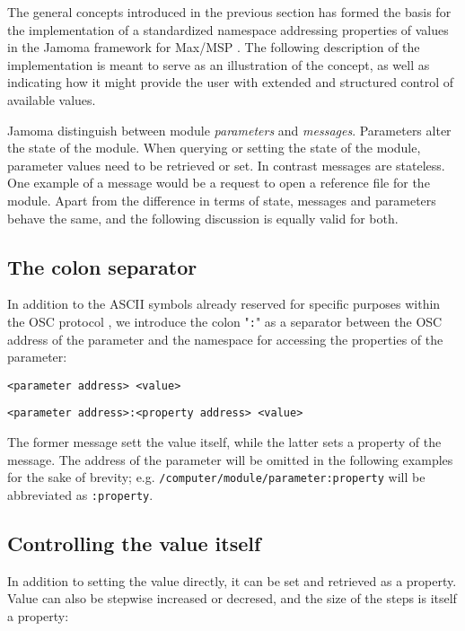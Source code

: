 \documentclass{sig-alternate}
\begin{document}
The general concepts introduced in the previous section has formed the basis for the implementation of a standardized namespace addressing properties of values in the Jamoma framework for Max/MSP \cite{Place:2006}. The following description of the implementation is meant to serve as an illustration of the concept, as well as indicating how it might provide the user with extended and structured control of available values.

Jamoma distinguish between module \emph{parameters} and \emph{messages}. Parameters alter the state of the module. When querying or setting the state of the module, parameter values need to be retrieved or set. In contrast messages are stateless. One example of a message would be a request to open a reference file for the module. Apart from the difference in terms of state, messages and parameters behave the same, and the following discussion is equally valid for both.

\subsection{The colon separator} %
\label{sub:the_colon_separator}

In addition to the ASCII symbols already reserved for specific purposes within the OSC protocol \cite{Wright:1997}, we introduce the colon "\texttt{:}" as a separator between the OSC address of the parameter and the namespace for accessing the properties of the parameter:

\texttt{<parameter address> <value>}

\texttt{<parameter address>:<property address> <value>}

The former message sett the value itself, while the latter sets a property of the message. The address of the parameter will be omitted in the following examples for the sake of brevity; e.g. \texttt{/computer/module/parameter:property} will be abbreviated as \texttt{:property}.


\subsection{Controlling the value itself} %
\label{sub:controlling_the_value_itself}

In addition to setting the value directly, it can be set and retrieved as a property. Value can also be stepwise increased or decresed, and the size of the steps is itself a property:
\end{document}
